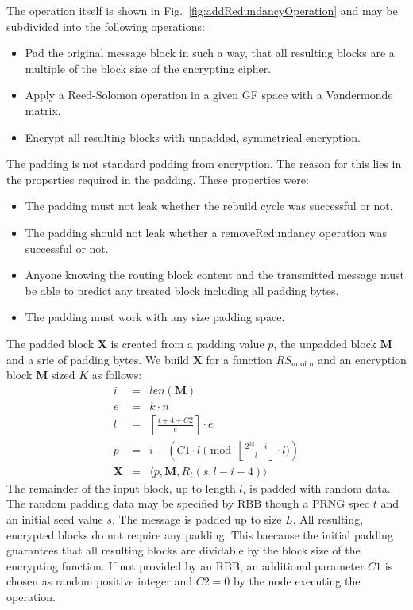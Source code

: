 \documentclass[10pt,journal,compsoc,twocolumn,twoside]{IEEEtran}
\begin{document}
The operation itself is shown in Fig.~\ref{fig:addRedundancyOperation} and may be subdivided into the following operations:
\begin{itemize}
	\item Pad the original message block in such a way, that all resulting blocks are a multiple of the block size of the encrypting cipher.
	\item Apply a Reed-Solomon operation in a given GF space with a Vandermonde matrix.
	\item Encrypt all resulting blocks with unpadded, symmetrical encryption.
\end{itemize}

The padding is not standard padding from encryption. The reason for this lies in the properties required in the padding. These properties were:
\begin{itemize}
	\item The padding must not leak whether the rebuild cycle was successful or not.
	\item The padding should not leak whether a removeRedundancy operation was successful or not. 
	\item Anyone knowing the routing block content and the transmitted message must be able to predict any treated block including all padding bytes.
	\item The padding must work with any size padding space.
\end{itemize}

The padded block $\mathbf{X}$ is created from a padding value $p$, the unpadded block $\mathbf{M}$ and a srie of padding bytes. We build $\mathbf{X}$ for a function $RS_{\text{m of n}}$ and an encryption block $\mathbf{M}$ sized $K$ as follows:
\begin{eqnarray}
i          & = & len(\mathbf{M})\\
e          & = & k \cdot n\\
l          & = & \left\lceil\frac{i + 4 + C2 }{e}\right\rceil\cdot e\\
p          & = & i + \left( C1 \cdot l \pmod{\left\lfloor\frac{2^{32}-i}{l}\right\rfloor\cdot l}\right)\\
\mathbf{X} & = & \langle p,\mathbf{M},R_{t}\left(s,l-i-4\right)\rangle
\end{eqnarray}    
The remainder of the input block, up to length $l$, is padded with random data. The random padding data may be specified by RBB though a PRNG spec $t$ and an initial seed value $s$. The message is padded up to size $L$. All resulting, encrypted blocks do not require any padding. This baecause the initial padding guarantees that all resulting blocks are dividable by the block size of the encrypting function. If not provided by an RBB, an additional parameter $C1$ is chosen as random positive integer and $C2=0$  by the node executing the operation.
\end{document}

